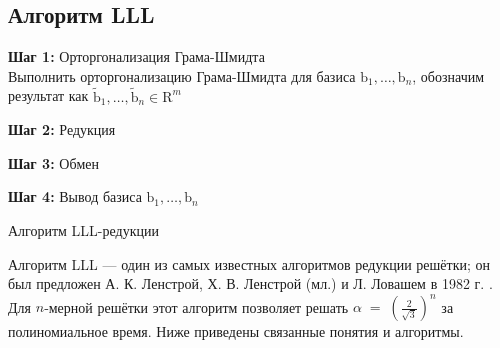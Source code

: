 \subsection*{Алгоритм LLL}
\begin{algorithm}[htp!]
    \SetAlgoLined


    \textbf{Шаг 1:} Орторгонализация Грама-Шмидта \\
    Выполнить орторгонализацию Грама-Шмидта для базиса $\text{b}_1, \dots, \text{b}_n$, обозначим результат как $\tilde{\text{b}}_1, \dots, \tilde{\text{b}}_n \in \text{R}^m$

    \textbf{Шаг 2:} Редукция


    \textbf{Шаг 3:} Обмен


    \textbf{Шаг 4:} Вывод базиса $\text{b}_1, \dots, \text{b}_n$

    \caption{Алгоритм LLL-редукции}
    \label{alg:lll}
\end{algorithm}

Алгоритм LLL — один из самых известных алгоритмов редукции решётки; он был
предложен А. К. Ленстрой, Х. В. Ленстрой (мл.) и Л. Ловашем в 1982 г.
\cite{cite_35}. Для $n$‑мерной решётки этот алгоритм позволяет решать $\alpha
\;=\; \left(\frac{2}{\sqrt{3}}\right)^{n}$ за полиномиальное время. Ниже
приведены связанные понятия и алгоритмы.


